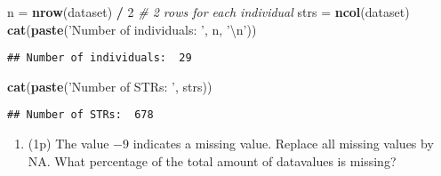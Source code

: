 \documentclass[
]{article}
\newenvironment{Shaded}{\begin{snugshade}}{\end{snugshade}}
\newcommand{\CharTok}[1]{\textcolor[rgb]{0.31,0.60,0.02}{#1}}
\newcommand{\CommentTok}[1]{\textcolor[rgb]{0.56,0.35,0.01}{\textit{#1}}}
\newcommand{\DecValTok}[1]{\textcolor[rgb]{0.00,0.00,0.81}{#1}}
\newcommand{\KeywordTok}[1]{\textcolor[rgb]{0.13,0.29,0.53}{\textbf{#1}}}
\newcommand{\NormalTok}[1]{#1}
\newcommand{\OperatorTok}[1]{\textcolor[rgb]{0.81,0.36,0.00}{\textbf{#1}}}
\newcommand{\OtherTok}[1]{\textcolor[rgb]{0.56,0.35,0.01}{#1}}
\newcommand{\StringTok}[1]{\textcolor[rgb]{0.31,0.60,0.02}{#1}}
\providecommand{\tightlist}{%
  \setlength{\itemsep}{0pt}\setlength{\parskip}{0pt}}
\begin{document}
\begin{Shaded}
\begin{Highlighting}[]
\NormalTok{n =}\StringTok{ }\KeywordTok{nrow}\NormalTok{(dataset) }\OperatorTok{/}\StringTok{ }\DecValTok{2} \CommentTok{# 2 rows for each individual}
\NormalTok{strs =}\StringTok{ }\KeywordTok{ncol}\NormalTok{(dataset)}
\KeywordTok{cat}\NormalTok{(}\KeywordTok{paste}\NormalTok{(}\StringTok{'Number of individuals: '}\NormalTok{, n, }\StringTok{'}\CharTok{\textbackslash{}n}\StringTok{'}\NormalTok{))}
\end{Highlighting}
\end{Shaded}

\begin{verbatim}
## Number of individuals:  29
\end{verbatim}

\begin{Shaded}
\begin{Highlighting}[]
\KeywordTok{cat}\NormalTok{(}\KeywordTok{paste}\NormalTok{(}\StringTok{'Number of STRs: '}\NormalTok{, strs))}
\end{Highlighting}
\end{Shaded}

\begin{verbatim}
## Number of STRs:  678
\end{verbatim}

\begin{enumerate}
\def\labelenumi{\arabic{enumi}.}
\setcounter{enumi}{2}
\tightlist
\item
  (1p) The value \(-9\) indicates a missing value. Replace all missing
  values by NA. What percentage of the total amount of datavalues is
  missing?
\end{enumerate}

\begin{Shaded}
\end{Shaded}
\end{document}
